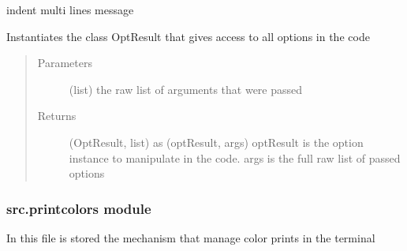\documentclass[a4paper,10pt,english]{sphinxmanual}
\begin{document}
\begin{fulllineitems}
\begin{fulllineitems}
\begin{quote}
\begin{description}
\end{description}\end{quote}

\end{fulllineitems}


\begin{fulllineitems}
\label{\detokenize{commands/apidoc/src:src.options.Options.indent}}
indent multi lines message

\end{fulllineitems}


\begin{fulllineitems}
\label{\detokenize{commands/apidoc/src:src.options.Options.parse_args}}
Instantiates the class OptResult 
that gives access to all options in the code
\begin{quote}\begin{description}
\item[{Parameters}] \leavevmode
{} \textendash{} (list) the raw list of arguments that were passed

\item[{Returns}] \leavevmode
(OptResult, list) as (optResult, args) 
optResult is the option instance to manipulate in the code. 
args is the full raw list of passed options

\end{description}\end{quote}

\end{fulllineitems}


\end{fulllineitems}



\subsubsection{src.printcolors module}
\label{\detokenize{commands/apidoc/src:module-src.printcolors}}\label{\detokenize{commands/apidoc/src:src-printcolors-module}}
In this file is stored the mechanism that manage color prints in the terminal
\end{document}
